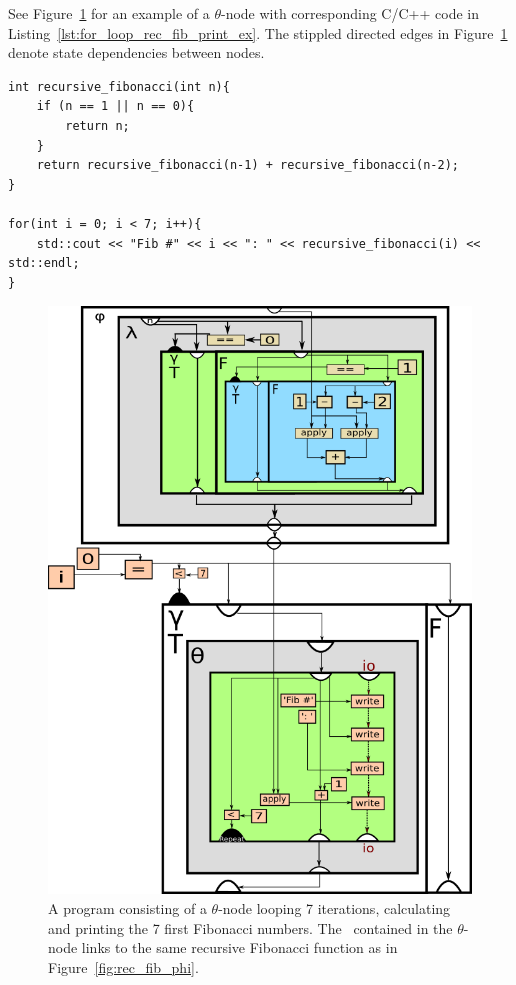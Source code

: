 \begin{itemize}
See Figure~\ref{fig:for_loop_rec_fib_print_ex} for an example of a $\theta$-node
with corresponding C/C++ code in Listing~\ref{lst:for_loop_rec_fib_print_ex}.
The stippled directed edges in Figure~\ref{fig:for_loop_rec_fib_print_ex} denote
state dependencies between nodes.

\begin{lstlisting}[label={lst:for_loop_rec_fib_print_ex}, style=global_customcpp,
caption={C/C++ code corresponding to the RVSDG subgraph in
Figure~\ref{fig:for_loop_rec_fib_print_ex}.}]
int recursive_fibonacci(int n){
	if (n == 1 || n == 0){
		return n;
	}
	return recursive_fibonacci(n-1) + recursive_fibonacci(n-2);
}

for(int i = 0; i < 7; i++){
	std::cout << "Fib #" << i << ": " << recursive_fibonacci(i) << std::endl;
}
\end{lstlisting}
\vspace{-4\parskip} %
\newpage

\begin{figure}[ht!]
	\centering
	\includegraphics[width=\textwidth]{figures/for-loop-printf-rec_fib-example}
	\caption{A program consisting of a $\theta$-node looping 7 iterations,
calculating and printing the 7 first Fibonacci numbers. The \applyNode ~contained
in the $\theta$-node links to the same recursive Fibonacci function as in
Figure~\ref{fig:rec_fib_phi}.}
	\label{fig:for_loop_rec_fib_print_ex}
\end{figure}


\end{itemize}
